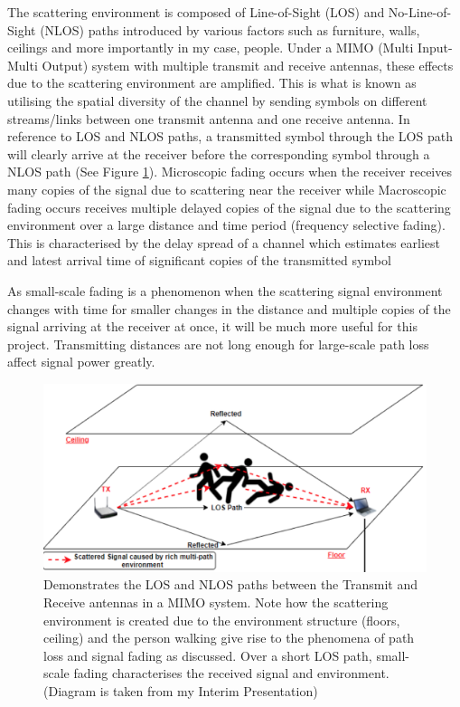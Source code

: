 The scattering environment is composed of Line-of-Sight (LOS) and No-Line-of-Sight (NLOS) paths introduced by various factors such as furniture, walls, ceilings and more importantly in my case, people. Under a MIMO (Multi Input-Multi Output) system with multiple transmit and receive antennas, these effects due to the scattering environment are amplified. This is what is known as utilising the spatial diversity of the channel by sending symbols on different streams/links between one transmit antenna and one receive antenna. In reference to LOS and NLOS paths, a transmitted symbol through the LOS path will clearly arrive at the receiver before the corresponding symbol through a NLOS path (See Figure \ref{fig:LOS_NLOS}). Microscopic fading occurs when the receiver receives many copies of the signal due to scattering near the receiver while Macroscopic fading occurs receives multiple delayed copies of the signal due to the scattering environment over a large distance and time period (frequency selective fading). This is characterised by the delay spread of a channel which estimates earliest and latest arrival time of significant copies of the transmitted symbol \citep{channelModels, articleWLAN}  \par
As small-scale fading is a phenomenon when the scattering signal environment changes with time for smaller changes in the distance and multiple copies of the signal arriving at the receiver at once, it will be much more useful for this project. Transmitting distances are not long enough for large-scale path loss affect signal power greatly. \par
\begin{figure}[h]
\begin{center}
  \includegraphics[scale=0.75]{Figures/Reflection.png}
\end{center}
  \caption{Demonstrates the LOS and NLOS paths between the Transmit and Receive antennas in a MIMO system. Note how the scattering environment is created due to the environment structure (floors, ceiling) and the person walking give rise to the phenomena of path loss and signal fading as discussed. Over a short LOS path, small-scale fading characterises the received signal and environment. (Diagram is taken from my Interim Presentation)}
  \vspace{-10pt}
  \label{fig:LOS_NLOS}
\end{figure}
